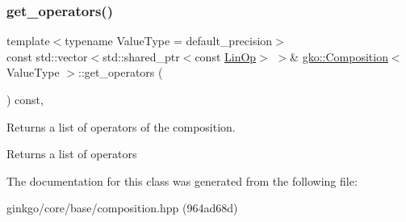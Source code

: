 \subsubsection{\texorpdfstring{get\+\_\+operators()}{get\_operators()}}
{\footnotesize\ttfamily template$<$typename Value\+Type  = default\+\_\+precision$>$ \\
const std\+::vector$<$std\+::shared\+\_\+ptr$<$const \hyperlink{classgko_1_1LinOp}{Lin\+Op}$>$ $>$\& \hyperlink{classgko_1_1Composition}{gko\+::\+Composition}$<$ Value\+Type $>$\+::get\+\_\+operators (\begin{DoxyParamCaption}{ }\end{DoxyParamCaption}) const\hspace{0.3cm}{\ttfamily [inline]}, {\ttfamily [noexcept]}}



Returns a list of operators of the composition. 

\begin{DoxyReturn}{Returns}
a list of operators 
\end{DoxyReturn}


The documentation for this class was generated from the following file\+:\begin{DoxyCompactItemize}
\item 
ginkgo/core/base/composition.\+hpp (964ad68d)\end{DoxyCompactItemize}

